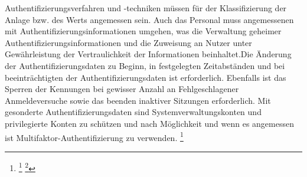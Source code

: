 \documentclass[11pt,a4paper,hidelinks]{article}   %
\begin{document}
Authentifizierungsverfahren und -techniken müssen für der Klassifizierung der Anlage bzw. des Werts angemessen sein. Auch das Personal muss angemessenen mit Authentifizierungsinformationen umgehen, was die Verwaltung geheimer Authentifizierungsinformationen und die Zuweisung an Nutzer unter Gewährleistung der Vertraulichkeit der Informationen beinhaltet.Die Änderung der Authentifizierungsdaten zu Beginn, in festgelegten Zeitabständen und bei beeinträchtigten der Authentifizierungsdaten ist erforderlich. Ebenfalls ist das Sperren der Kennungen bei gewisser Anzahl an Fehlgeschlagener Anmeldeversuche sowie das beenden inaktiver Sitzungen erforderlich. Mit gesonderte Authentifizierungsdaten sind Systemverwaltungskonten und privilegierte Konten zu schützen und nach Möglichkeit und wenn es angemessen ist Multifaktor-Authentifizierung zu verwenden. \footnote{
                \footcite[Vgl. Nummer 11,][, Anhang]{EU2024-2690}
                \footcite[Vgl. §30 Absatz 2, Nummer 9 und 10,][]{NIS2UmsuCG} %
            }

\end{document}
